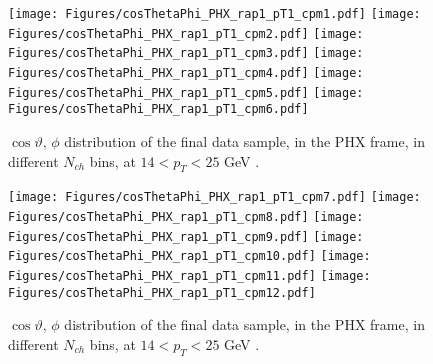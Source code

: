 \documentclass[12pt]{article}
\newcommand{\pt}{$p_{\mathrm{T}}$}
\begin{document}
%
%

\begin{figure}[htbp]
\centering
\texttt{[image: Figures/cosThetaPhi\_PHX\_rap1\_pT1\_cpm1.pdf]}
\texttt{[image: Figures/cosThetaPhi\_PHX\_rap1\_pT1\_cpm2.pdf]}
\texttt{[image: Figures/cosThetaPhi\_PHX\_rap1\_pT1\_cpm3.pdf]}
\texttt{[image: Figures/cosThetaPhi\_PHX\_rap1\_pT1\_cpm4.pdf]}
\texttt{[image: Figures/cosThetaPhi\_PHX\_rap1\_pT1\_cpm5.pdf]}
\texttt{[image: Figures/cosThetaPhi\_PHX\_rap1\_pT1\_cpm6.pdf]}
\caption{$\cos\vartheta,\,\phi$ distribution of the final data sample, 
	in the PHX frame, in different $N_{ch}$ bins, at $14 < p_{T} < 25$ GeV .}
\end{figure}
\clearpage

\begin{figure}[htbp]
\centering
\texttt{[image: Figures/cosThetaPhi\_PHX\_rap1\_pT1\_cpm7.pdf]}
\texttt{[image: Figures/cosThetaPhi\_PHX\_rap1\_pT1\_cpm8.pdf]}
\texttt{[image: Figures/cosThetaPhi\_PHX\_rap1\_pT1\_cpm9.pdf]}
\texttt{[image: Figures/cosThetaPhi\_PHX\_rap1\_pT1\_cpm10.pdf]}
\texttt{[image: Figures/cosThetaPhi\_PHX\_rap1\_pT1\_cpm11.pdf]}
\texttt{[image: Figures/cosThetaPhi\_PHX\_rap1\_pT1\_cpm12.pdf]}
\caption{$\cos\vartheta,\,\phi$ distribution of the final data sample, 
	in the PHX frame, in different $N_{ch}$ bins, at $14 < p_{T} < 25$ GeV .}
\end{figure}
\clearpage
\end{document}
